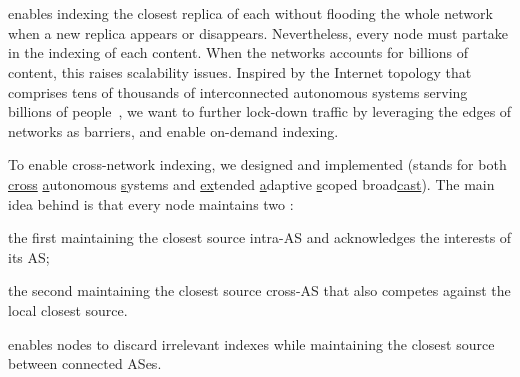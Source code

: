 
\section{\NAMEC}
\label{sec:proposal2}

\NAME enables indexing the closest replica of each \process without
flooding the whole network when a new replica appears or disappears.
Nevertheless, every node must partake in the indexing of each
content. When the networks accounts for billions of content, this
raises scalability issues. Inspired by the Internet topology that
comprises tens of thousands of interconnected autonomous systems
serving billions of people~\cite{nur2018crossas}, we want to further
lock-down traffic by leveraging the edges of networks as barriers, and
enable on-demand indexing.

To enable cross-network indexing, we designed and implemented \NAMEC
(stands for both \underline{cross} \underline{a}utonomous
\underline{s}ystems and \underline{ex}tended \underline{a}daptive
\underline{s}coped broad\underline{cast}). The main idea behind \NAMEC
is that every node maintains two \NAME:
\begin{inparaenum}[(i)]
\item the first maintaining the closest source intra-AS and
  acknowledges the interests of its AS;
\item the second maintaining the closest source cross-AS that also
  competes against the local closest source.
\end{inparaenum}
\NAMEC enables nodes to discard irrelevant indexes while maintaining
the closest source between connected ASes. 




